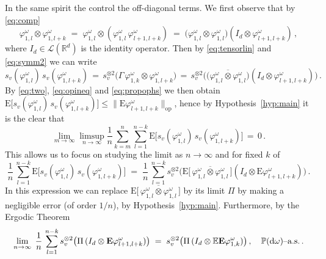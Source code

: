 \documentclass[a4paper,reqno,11pt]{amsart}
\numberwithin{equation}{section}
\newcommand{\bbE}{{\ensuremath{\mathbb E}} }
\newcommand{\bbP}{{\ensuremath{\mathbb P}} }
\newcommand{\cL}{{\ensuremath{\mathcal L}} }
\newcommand{\gp}{\varphi}
\newcommand{\go}{\omega}
\newcommand{\dd}{\text{\rm d}}             %
\newcommand{\R}{\mathbb{R}}
\def\bE{\ensuremath{\bs{\mathrm{E}}}}
\def\bs{\boldsymbol}
\begin{document}
In the same spirit the control the off-diagonal terms. We first observe that
by \eqref{eq:comp}
\begin{equation}
	\varphi_{1,l}^\omega \otimes \varphi^\omega_{1,l+k}
	\;=\; \varphi_{1,l}^\omega \otimes ( \varphi^\omega_{1,l} \, \varphi^\omega_{l+1,l+k} )
	\;=\; \big( \varphi_{1,l}^\omega \otimes \varphi^\omega_{1,l} \big)
	(I_d \otimes \varphi^\omega_{l+1,l+k}) \,,
\end{equation}
where $I_d \in \cL(\R^d)$ is the identity operator. Then
by \eqref{eq:tensorlin} and \eqref{eq:symm2} we can write
\begin{equation}
	s_{v}( \gp_{1,l}^\go) \, s_{v}( \gp_{1,l+k}^\go)
	\,=\, s_v^{\otimes 2} \big( \Gamma \, \gp_{1,k}^\go \otimes \gp_{1,l+k}^\go \big)
	\,=\, s_v^{\otimes 2} \big( \big( 
	\overline{\varphi_{1,l}^\omega \otimes \varphi^\omega_{1,l}} \big)
	(I_d \otimes \varphi^\omega_{l+1,l+k}) \big) \,.
\end{equation}
By \eqref{eq:two}, \eqref{eq:opineq} and \eqref{eq:propophs} we then obtain
$\bE \big[ s_{v}( \gp_{1,l}^\go) \, s_{v}( \gp_{1,l+k}^\go) \big]
\le \big\| \bE \varphi^\omega_{l+1,l+k} \big\|_{\text{op}}$,
hence by Hypothesis~\ref{hyp:main} it is the clear that
 \begin{equation}
 \label{eq:off-d1}
 \lim_{m \to \infty} \limsup_{n \to \infty}
 \frac 1n 
 \sum_{k=m}^n
\sum_{l=1}^{n-k} \bE \big[ s_{v}( \gp_{1,l}^\go) \, s_{v}( \gp_{1,l+k}^\go) \big] \, =\, 0 \,.
 \end{equation}
This allows us to focus on studying the limit as $n \to \infty$ and for fixed $k$ of 
\begin{equation}
\label{eq:withH}
	\frac 1n \, \sum_{l=1}^{n-k} \bE \big[ s_{v}( \gp_{1,l}^\go) \, s_{v}( \gp_{1,l+k}^\go) \big] 
	\;=\; \frac 1n \, \sum_{l=1}^{n-k} s_v^{\otimes 2}
	\big( \bE \big[ \, \overline{\varphi_{1,l}^\omega \otimes \varphi^\omega_{1,l}} \, \big]
	(I_d \otimes \bE \varphi^\omega_{l+1,l+k} ) \big)  \,.
\end{equation}
In this expression we can replace 
$\bE \big[\, \overline{\varphi_{1,l}^\omega \otimes \varphi^\omega_{1,l}}\, \big]$
by its limit $\Pi$ by making a negligible error (of order $1/n$),
by Hypothesis~\ref{hyp:main}. Furthermore, by the Ergodic Theorem
\begin{equation}
\label{eq:witherg}
\lim_{n \to \infty} \;
\frac {1} n  \,
\sum_{l=1}^{n-k}  s_v^{\otimes 2} \big( \Pi \,
(I_d \otimes \bE \varphi^\omega_{l+1,l+k} ) \big) \; =\;
s_v^{\otimes 2} \big( \Pi \, (I_d \otimes \bbE  \bE \varphi^\omega_{1,k})  \big) \,,
\quad \text{$\bbP(\dd \go)$--a.s.}\,.
\end{equation}
\end{document}

